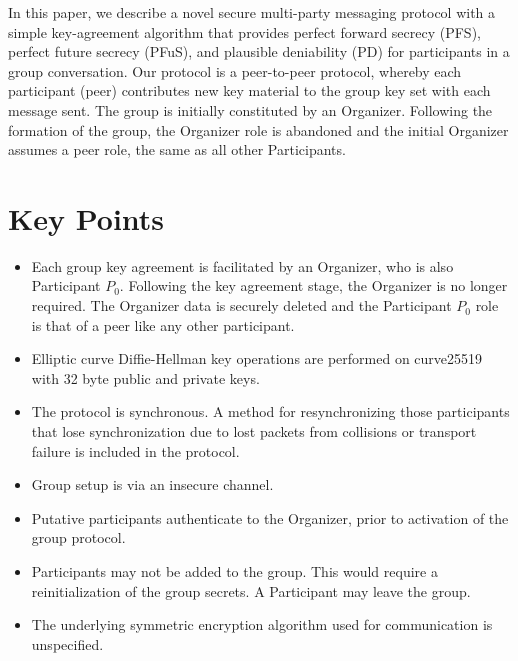 \documentclass[%
preprint,
amsmath,amssymb,
aps,
prb,
floatfix,
]{revtex4-1}
\begin{document}
In this paper, we describe a novel secure multi-party messaging protocol with a
simple key-agreement algorithm that provides perfect forward secrecy (PFS),
perfect future secrecy (PFuS),
and plausible deniability (PD) for participants in a group conversation. Our protocol
is a peer-to-peer protocol, whereby each
participant (peer) contributes new
key material to the group key set with each message sent. The group is
initially constituted by an Organizer. Following the formation of the group, the
Organizer role is abandoned and the initial Organizer assumes a peer role, the
same as all other Participants.

\section{\label{sec:keypoints}Key Points}
\begin{itemize}
\item Each group key agreement is facilitated by an Organizer, who is also
Participant $P_0$. Following the key agreement stage, the Organizer is no longer
required. The Organizer data is securely deleted and the Participant
$P_0$ role is that of a peer like any other
participant.
\item Elliptic curve Diffie-Hellman key operations are performed on curve25519
with 32 byte
public and private keys.
\item The protocol is synchronous. A method for resynchronizing those
participants that lose synchronization due to lost packets from collisions or
transport failure is included in the protocol.
\item Group setup is via an insecure channel.
\item Putative participants authenticate to the Organizer, prior to
activation of the group protocol.
\item Participants may not be added to the group. This would
require a reinitialization of the group secrets. A Participant may leave the
group.
\item The underlying symmetric encryption algorithm used for communication is
unspecified.
\end{itemize}
\end{document}

